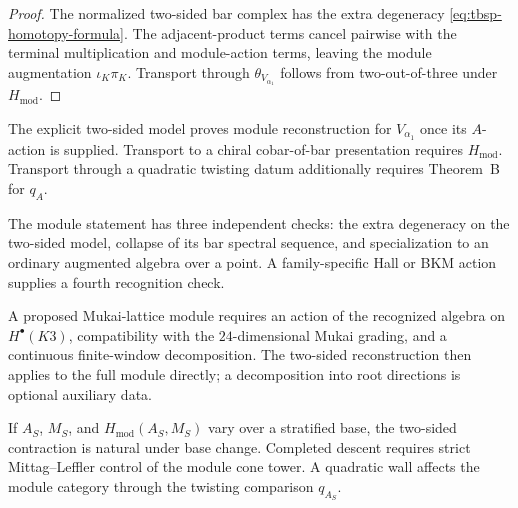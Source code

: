 \begin{proof}
The normalized two-sided bar complex has the extra degeneracy
\eqref{eq:tbsp-homotopy-formula}.  The adjacent-product terms cancel
pairwise with the terminal multiplication and module-action terms,
leaving the module augmentation \(\iota_K\pi_K\).  Transport through
\(\theta_{V_{\alpha_1}}\) follows from two-out-of-three under
\(H_{\mathrm{mod}}\).
\end{proof}

\begin{corollary}
\label{cor:tbsp-named-module-theorem-B}
The explicit two-sided model proves module reconstruction for
\(V_{\alpha_1}\) once its \(A\)-action is supplied.  Transport to a
chiral cobar-of-bar presentation requires \(H_{\mathrm{mod}}\).
Transport through a quadratic twisting datum additionally requires
Theorem~B for \(q_A\).
\end{corollary}

\begin{remark}
\label{rem:tbsp-module-four-checks-valpha1}
The module statement has three independent checks: the extra
degeneracy on the two-sided model, collapse of its bar spectral
sequence, and specialization to an ordinary augmented algebra over a
point.  A family-specific Hall or BKM action supplies a fourth
recognition check.
\end{remark}

\begin{remark}
\label{rem:tbsp-heisenberg-yangian-standard}
A proposed Mukai-lattice module requires an action of the recognized
algebra on \(H^\bullet(K3)\), compatibility with the \(24\)-dimensional
Mukai grading, and a continuous finite-window decomposition.  The
two-sided reconstruction then applies to the full module directly;
a decomposition into root directions is optional auxiliary data.
\end{remark}

\begin{remark}
\label{rem:tbsp-module-humbert-scope}
If \(A_S\), \(M_S\), and \(H_{\mathrm{mod}}(A_S,M_S)\) vary over a
stratified base, the two-sided contraction is natural under base
change.  Completed descent requires strict Mittag--Leffler control of
the module cone tower.  A quadratic wall affects the module category
through the twisting comparison \(q_{A_S}\).
\end{remark}

